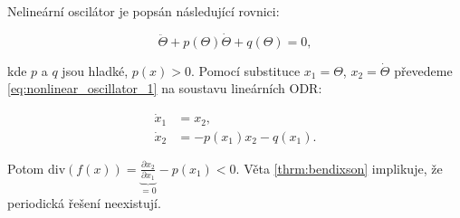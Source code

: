 \medskip

\begin{exmp}\label{exmp:nonlinear_oscillator}
	Nelineární oscilátor je popsán následující rovnici:
	
	\begin{equation}\label{eq:nonlinear_oscillator_1}
		\ddot{\Theta} + p(\Theta) \dot{\Theta} + q(\Theta) = 0,
	\end{equation}
	
	\noindent
	kde $p$ a $q$ jsou hladké, $p(x) > 0$. Pomocí substituce $x_{1} = \Theta$, $x_{2} = \dot{\Theta}$ převedeme \eqref{eq:nonlinear_oscillator_1} na soustavu lineárních ODR:
	
	\begin{equation}\label{eq:nonlinear_oscillator_2}
		\begin{split}
			\dot{x}_{1} &= x_{2}, \\
			\dot{x}_{2} &= -p(x_{1}) x_{2} - q(x_{1}).
		\end{split}
	\end{equation}
	
	Potom $\mathrm{div}(f(x)) = \underbrace{ \frac{ \partial x_{2} }{ \partial x_{1} } }_{ = 0 }  - p(x_{1}) < 0$. Věta \ref{thrm:bendixson} implikuje, že periodická řešení neexistují.
\end{exmp}